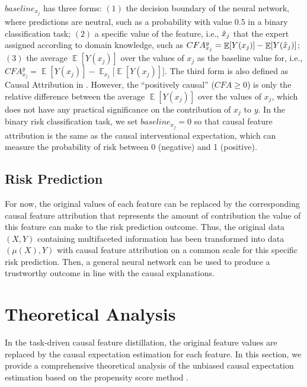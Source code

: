 \documentclass[letterpaper]{article} %
\DeclareMathOperator{\E}{\mathbb{E}}
\theoremstyle{definition}
\theoremstyle{remark}
\begin{document}
${baseline}_{x_j}$ has three forms: $(1)$ the decision boundary of the neural network, where predictions are neutral, such as a probability with value $0.5$ in a binary classification task; $(2)$ a specific value of the feature, i.e., $\Tilde{x}_j$ that the expert assigned according to domain knowledge, such as $ CFA^y_{x_j} =  \E [Y(x_j)] - \E [Y(\Tilde{x}_j)]$; $(3)$ the average $\E [Y(x_j)]$ over the values of $x_j$ as the baseline value for, i.e., $ CFA^y_{x_j} =  \E [Y(x_j)] - \E_{x_j} \Bigr[ \E [Y(x_j)] \Bigr]$. The third form is also defined as Causal Attribution in \cite{chattopadhyay2019neural}. However, the ``positively causal'' ($CFA \geq 0$) is only the relative difference between the average $\E [Y(x_j)]$ over the values of $x_j$, which does not have any practical significance on the contribution of $x_j$ to $y$. In the binary risk classification task, we set ${baseline}_{x_j}=0$ so that causal feature attribution is the same as the causal interventional expectation, which can measure the probability of risk between 0 (negative) and 1 (positive).


\subsection{Risk Prediction}

For now, the original values of each feature can be replaced by the corresponding causal feature attribution that represents the amount of contribution the value of this feature can make to the risk prediction outcome. Thus, the original data $(X,Y)$ containing multifaceted information has been transformed into data $(\mu(X),Y)$ with causal feature attribution on a common scale for this specific risk prediction. Then, a general neural network can be used to produce a trustworthy outcome in line with the causal explanations.


\section{Theoretical Analysis}


In the task-driven causal feature distillation, the original feature values are replaced by the causal expectation estimation for each feature. In this section, we provide a comprehensive theoretical analysis of the unbiased causal expectation estimation based on the propensity score method \cite{chu2023estimating}.
\end{document}
